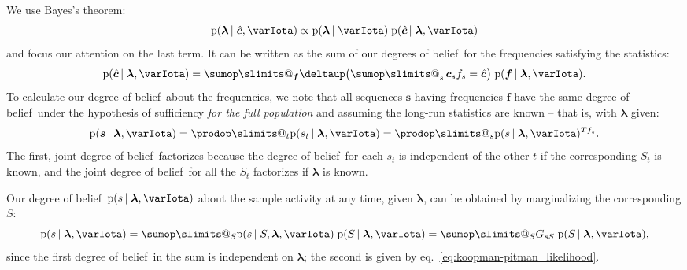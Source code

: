 \documentclass[\ifafour a4paper,12pt,\else a5paper,10pt,\fi%
onecolumn,oneside,article,%
british%
]{memoir}
\makeatletter
\theoremstyle{remark}
\theoremstyle{innote}
\def\sum{\DOTSI\sumop\slimits@}
\def\prod{\DOTSI\prodop\slimits@}
\newcommand*{\delt}{\deltaup}%
\newcommand*{\pf}{\mathrm{p}}%
\renewcommand*{\|}{\nonscript\,\vert\nonscript\;\mathopen{}}
\newcommand*{\eqn}{eq.}%
\newcommand*{\tsum}{\mathop{\textstyle\sum}\nolimits}
\newcommand*{\dob}{degree of belief}
\newcommand*{\dobs}{degrees of belief}
\newcommand*{\yS}{S}
\newcommand*{\ys}{s}
\newcommand*{\yst}{\bm{\ys}}
\newcommand*{\yl}{\bm{\lambda}}
\newcommand*{\yI}{\varIota}
\newcommand*{\yf}{\bm{f}}
\newcommand*{\ycs}{\bm{c}}
\newcommand*{\yccs}{\Hat{\bm{c}}}
\makeatother
\begin{document}
We use Bayes's theorem:
\begin{equation}
  \label{eq:posterior_given_sample}
  \pf(\yl \| \yccs, \yI) \propto \pf(\yl \| \yI)\;
  \pf(\yccs \| \yl, \yI)
\end{equation}
and focus our attention on the last term. It can be written as the sum of
our \dobs\ for the frequencies satisfying the statistics:
\begin{equation}
  \label{eq:stat_from_freqs}
  \pf(\yccs \| \yl, \yI) =
  \sum_{\yf} \delt\bigl(\tsum_{\ys} \ycs_{\ys} f_{\ys} = \yccs\bigr)\;
  \pf(\yf \| \yl, \yI).
\end{equation}
To calculate our \dob\ about the frequencies, we note that all sequences
$\yst$ having frequencies $\yf$ have the same \dob\ under the hypothesis
of sufficiency \emph{for the full population} and assuming the long-run
statistics are known -- that is, with $\yl$ given:
\begin{equation}
  \label{eq:prob_particular_sequence}
  \pf(\yst \|\yl, \yI) = \prod_t \pf(\ys_{t} \| \yl, \yI)
  = \prod_{\ys} \pf(\ys \| \yl, \yI)^{T f_{\ys}}.
\end{equation}
The first, joint \dob\ factorizes because the \dob\ for each $\ys_{t}$ is
independent of the other $t$ if the corresponding $\yS_{t}$ is known, and
the joint \dob\ for all the $\yS_{t}$ factorizes if $\yl$ is known.

Our \dob\ $\pf(\ys \| \yl, \yI)$ about the sample activity at any time,
given $\yl$, can be obtained by marginalizing the corresponding $\yS$:
\begin{equation}
  \label{eq:prob_sample_lambda}
  \pf(\ys \| \yl, \yI) =
  \sum_{\yS} \pf(\ys \| \yS, \yl, \yI)\;\pf(\yS \| \yl, \yI)
  = \sum_{\yS} G_{\ys\yS}\;\pf(\yS \| \yl, \yI),
\end{equation}
since the first \dob\ in the sum is independent on $\yl$; the second is
given by \eqn~\eqref{eq:koopman-pitman_likelihood}.
\end{document}
